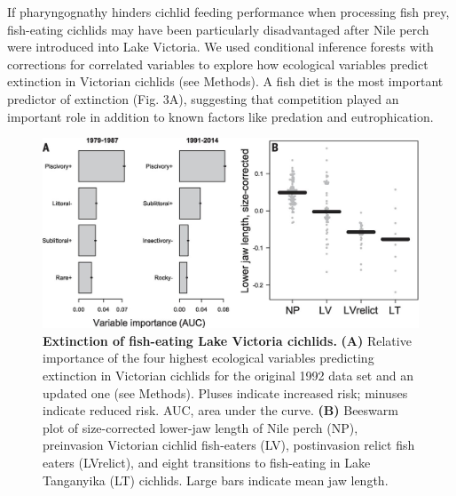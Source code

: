 If pharyngognathy hinders cichlid feeding performance when processing fish prey, fish-eating cichlids may have been particularly disadvantaged after Nile perch were introduced into Lake Victoria. We used conditional inference forests with corrections for correlated variables to explore how ecological variables predict extinction in Victorian cichlids (see Methods). A fish diet is the most important predictor of extinction (Fig. 3A), suggesting that competition played an important role in addition to known factors like predation \cite{witte_destruction_1992} and eutrophication. \cite{seehausen_cichlid_1997, van_rijssel_adaptive_2013}

\begin{figure}
    \centering
    \includegraphics[width=\textwidth]{FishJaws/figures/fig3}
    \caption{\textbf{Extinction of fish-eating Lake Victoria cichlids.} \textbf{(A)} Relative importance of the four highest ecological variables predicting extinction in Victorian cichlids for the original 1992 data set \cite{witte_destruction_1992} and an updated one (see Methods). Pluses indicate increased risk; minuses indicate reduced risk. AUC, area under the curve. \textbf{(B)} Beeswarm plot of size-corrected lower-jaw length of Nile perch (NP), preinvasion Victorian cichlid fish-eaters (LV), postinvasion relict fish eaters (LVrelict), and eight transitions to fish-eating in Lake Tanganyika (LT) cichlids. Large bars indicate mean jaw length.}
    \label{FJ_fig3}
\end{figure}


